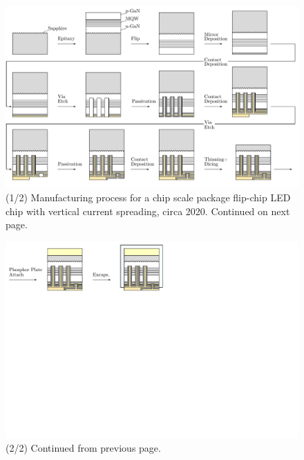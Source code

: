 \documentclass[10pt]{article}
\begin{document}

    \begin{landscape}
        \begin{figure}
            \includegraphics[width=595pt]{./figures/csp_overview_2020-1.pdf}
            \caption{(1/2) Manufacturing process for a chip scale package flip-chip LED chip with vertical current spreading, circa 2020. Continued on next page.}
            \label{fig:manuf_csp_2020-1}
        \end{figure}
    \end{landscape}

    \begin{landscape}
        \begin{figure}
            \includegraphics[width=595pt]{./figures/csp_overview_2020-2.pdf}
            \caption{(2/2) Continued from previous page.}
            \label{fig:manuf_csp_2020-2}
        \end{figure}
    \end{landscape}
\end{document}
